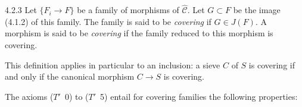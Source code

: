 \begin{definition}{4.2.3}
\label{IV.4.2.3}
Let \(\{F_{i}\to F\}\) be a family of morphisms of
\(\widehat{\mathcal{C}}\). Let \(G\subset F\) be the image (4.1.2) of this
family. The family is said to be \emph{covering} if \(G\in J(F)\). A
morphism is said to be \emph{covering} if the family reduced to this
morphism is covering.
\end{definition}

This definition applies in particular to an inclusion: a sieve \(C\) of
\(S\) is covering if and only if the canonical morphism \(C\to S\) is
covering.

The axioms (\(T'\)~0) to (\(T'\)~5) entail for covering families the
following properties:
